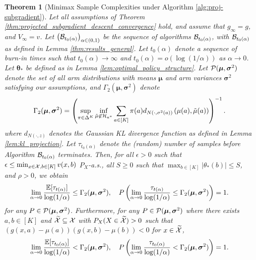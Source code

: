 \documentclass{article}
\newtheorem{theorem}{Theorem}
\begin{document}
\begin{theorem}[Minimax Sample Complexities under Algorithm \ref{alg:proj-subgradient}]\label{thm:sampling_complexity_final}
Let all assumptions of Theorem \ref{thm:projected_subgradient_descent_convergence} hold, and assume that $g_\infty = g$, and ${V}_\infty = v$. Let $\left(\mathcal{B}_{t_0(\alpha)}\right)_{\alpha \in (0,1)}$ be the sequence of algorithms $\mathcal{B}_{t_0(\alpha)}$, with $\mathcal{B}_{t_0(\alpha)}$ as defined in Lemma \ref{thm:results_general}. Let $t_0(\alpha)$ denote a sequence of burn-in times such that $t_0(\alpha) \rightarrow \infty$ and $t_0(\alpha) = o(\log(1/\alpha))$ as $\alpha \rightarrow 0$. Let $\bm{\theta}_*$ be defined as in Lemma \ref{lem:optimal_policy_structure}. Let $\mathcal{P}(\boldsymbol{\mu}, \boldsymbol{\sigma}^2)$ denote the set of all arm distributions with means $\bm{\mu}$ and arm variances $\bm{\sigma}^2$ satisfying our assumptions, and $\Gamma_2(\bm{\mu}, \bm{\sigma}^2)$ denote
\begin{equation}\label{eq:gamma_2}
    \Gamma_2(\boldsymbol\mu, \boldsymbol\sigma^2) = \left(\sup_{\pi \in \Delta^K} \inf_{\tilde\mu \not\in \mathcal{H}_{a^*}} \sum_{a \in [K]} \pi(a) d_{N(\cdot, \sigma^2(a))}\left(\mu(a), \tilde\mu(a)\right) \right)^{-1}.
\end{equation}
where $d_{N(\cdot, z)}$ denotes the Gaussian KL divergence function as defined in Lemma \ref{lem:kl_projection}. Let $\tau_{t_0(\alpha)}$ denote the (random) number of samples before Algorithm $\mathcal{B}_{t_0(\alpha)}$ terminates. Then, for all $\epsilon >0$ such that $\epsilon \leq \min_{x \in \mathcal{X}, b \in [K]}v(x,b)$ $P_X$-a.s., all $S \geq 0$ such that $\max_{b \in [K]} |\theta_*(b)| \leq S$, and $\rho >0$, we obtain   
\begin{equation}\label{eq:stopping_time_empirical_bound}
    \lim_{\alpha \rightarrow 0} \frac{\mathbb{E}[\tau_{t(\alpha)}]}{\log(1/\alpha)} \leq \Gamma_2(\boldsymbol\mu, \boldsymbol\sigma^2), \quad P\left(\lim_{\alpha \rightarrow 0}\frac{\tau_{t(\alpha)}}{\log(1/\alpha)} \leq \Gamma_2(\boldsymbol{\mu}, \boldsymbol\sigma^2)\right) = 1.
\end{equation}
for any $P \in \mathcal{P}(\boldsymbol{\mu}, \boldsymbol{\sigma}^2)$. 
Furthermore, for any $P \in \mathcal{P}(\boldsymbol{\mu}, \boldsymbol{\sigma}^2)$ where there exists $a,b \in [K]$ and $\widetilde{\mathcal{X}} \subseteq \mathcal{X}$ with $P_X(X \in \widetilde{\mathcal{X}}) > 0$ such that $(g(x,a)-\mu(a))(g(x,b)-\mu(b)) < 0$ for $x \in \widetilde{\mathcal{X}}$,
\begin{equation}
    \lim_{\alpha \rightarrow 0} \frac{\mathbb{E}[\tau_{t_0(\alpha)}]}{\log(1/\alpha)} < \Gamma_2(\boldsymbol\mu, \boldsymbol\sigma^2), \quad P\left(\lim_{\alpha \rightarrow 0}\frac{\tau_{t_0(\alpha)}}{\log(1/\alpha)} < \Gamma_2(\boldsymbol{\mu}, \boldsymbol\sigma^2)\right) = 1.
\end{equation}
\end{theorem}
\end{document}

